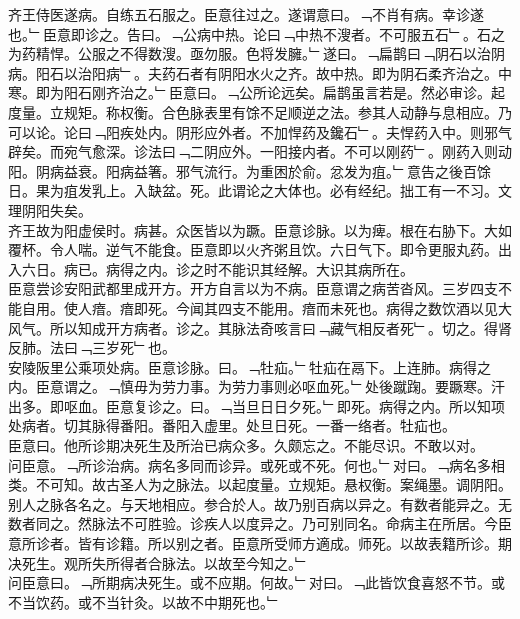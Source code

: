 \documentclass{zhvt-classic}
\begin{document}
\hspace*{2em}齐王侍医遂病。自练五石服之。臣意往过之。遂谓意曰。﹁不肖有病。幸诊遂也。﹂臣意即诊之。告曰。﹁公病中热。论曰﹁中热不溲者。不可服五石﹂。石之为药精悍。公服之不得数溲。亟勿服。色将发臃。﹂遂曰。﹁扁鹊曰﹁阴石以治阴病。阳石以治阳病﹂。夫药石者有阴阳水火之齐。故中热。即为阴石柔齐治之。中寒。即为阳石刚齐治之。﹂臣意曰。﹁公所论远矣。扁鹊虽言若是。然必审诊。起度量。立规矩。称权衡。合色脉表里有馀不足顺逆之法。参其人动静与息相应。乃可以论。论曰﹁阳疾处内。阴形应外者。不加悍药及鑱石﹂。夫悍药入中。则邪气辟矣。而宛气愈深。诊法曰﹁二阴应外。一阳接内者。不可以刚药﹂。刚药入则动阳。阴病益衰。阳病益箸。邪气流行。为重困於俞。忿发为疽。﹂意告之後百馀日。果为疽发乳上。入缺盆。死。此谓论之大体也。必有经纪。拙工有一不习。文理阴阳失矣。\\
\hspace*{2em}齐王故为阳虚侯时。病甚。众医皆以为蹶。臣意诊脉。以为痺。根在右胁下。大如覆杯。令人喘。逆气不能食。臣意即以火齐粥且饮。六日气下。即令更服丸药。出入六日。病已。病得之内。诊之时不能识其经解。大识其病所在。\\
\hspace*{2em}臣意尝诊安阳武都里成开方。开方自言以为不病。臣意谓之病苦沓风。三岁四支不能自用。使人瘖。瘖即死。今闻其四支不能用。瘖而未死也。病得之数饮酒以见大风气。所以知成开方病者。诊之。其脉法奇咳言曰﹁藏气相反者死﹂。切之。得肾反肺。法曰﹁三岁死﹂也。\\
\hspace*{2em}安陵阪里公乘项处病。臣意诊脉。曰。﹁牡疝。﹂牡疝在鬲下。上连肺。病得之内。臣意谓之。﹁慎毋为劳力事。为劳力事则必呕血死。﹂处後蹴踘。要蹶寒。汗出多。即呕血。臣意复诊之。曰。﹁当旦日日夕死。﹂即死。病得之内。所以知项处病者。切其脉得番阳。番阳入虚里。处旦日死。一番一络者。牡疝也。\\
\hspace*{2em}臣意曰。他所诊期决死生及所治已病众多。久颇忘之。不能尽识。不敢以对。\\
\hspace*{2em}问臣意。﹁所诊治病。病名多同而诊异。或死或不死。何也。﹂对曰。﹁病名多相类。不可知。故古圣人为之脉法。以起度量。立规矩。悬权衡。案绳墨。调阴阳。别人之脉各名之。与天地相应。参合於人。故乃别百病以异之。有数者能异之。无数者同之。然脉法不可胜验。诊疾人以度异之。乃可别同名。命病主在所居。今臣意所诊者。皆有诊籍。所以别之者。臣意所受师方適成。师死。以故表籍所诊。期决死生。观所失所得者合脉法。以故至今知之。﹂\\
\hspace*{2em}问臣意曰。﹁所期病决死生。或不应期。何故。﹂对曰。﹁此皆饮食喜怒不节。或不当饮药。或不当针灸。以故不中期死也。﹂\\
\end{document}
